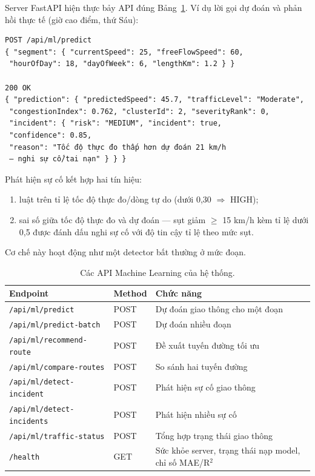 Server FastAPI hiện thực bảy API đúng Bảng~\ref{tab:api}. Ví dụ lời gọi dự đoán và phản hồi thực tế (giờ cao điểm, thứ Sáu):
\begin{verbatim}
POST /api/ml/predict
{ "segment": { "currentSpeed": 25, "freeFlowSpeed": 60,
 "hourOfDay": 18, "dayOfWeek": 6, "lengthKm": 1.2 } }

200 OK
{ "prediction": { "predictedSpeed": 45.7, "trafficLevel": "Moderate",
 "congestionIndex": 0.762, "clusterId": 2, "severityRank": 0,
 "incident": { "risk": "MEDIUM", "incident": true,
 "confidence": 0.85,
 "reason": "Tốc độ thực đo thấp hơn dự đoán 21 km/h
 — nghi sự cố/tai nạn" } } }
\end{verbatim}
Phát hiện sự cố kết hợp hai tín hiệu:
\begin{enumerate}[label=(\roman*),leftmargin=2.2cm,itemsep=2pt]
 \item luật trên tỉ lệ tốc độ thực đo/dòng tự do (dưới 0{,}30 $\Rightarrow$ HIGH);
 \item sai số giữa tốc độ thực đo và dự đoán --- sụt giảm $\ge$ 15 km/h kèm tỉ lệ dưới 0{,}5 được đánh dấu nghi sự cố với độ tin cậy tỉ lệ theo mức sụt.
\end{enumerate}
Cơ chế này hoạt động như một detector bất thường ở mức đoạn.

\begin{table}[h!]
\centering
\caption{Các API Machine Learning của hệ thống.}
\label{tab:api}
\small
\begin{tabularx}{\textwidth}{llX}
\toprule
\textbf{Endpoint} & \textbf{Method} & \textbf{Chức năng}\\
\midrule
\texttt{/api/ml/predict} & POST & Dự đoán giao thông cho một đoạn\\
\texttt{/api/ml/predict-batch} & POST & Dự đoán nhiều đoạn\\
\texttt{/api/ml/recommend-route} & POST & Đề xuất tuyến đường tối ưu\\
\texttt{/api/ml/compare-routes} & POST & So sánh hai tuyến đường\\
\texttt{/api/ml/detect-incident} & POST & Phát hiện sự cố giao thông\\
\texttt{/api/ml/detect-incidents} & POST & Phát hiện nhiều sự cố\\
\texttt{/api/ml/traffic-status} & POST & Tổng hợp trạng thái giao thông\\
\texttt{/health} & GET & Sức khỏe server, trạng thái nạp model, chỉ số MAE/R$^2$\\
\bottomrule
\end{tabularx}
\end{table}

